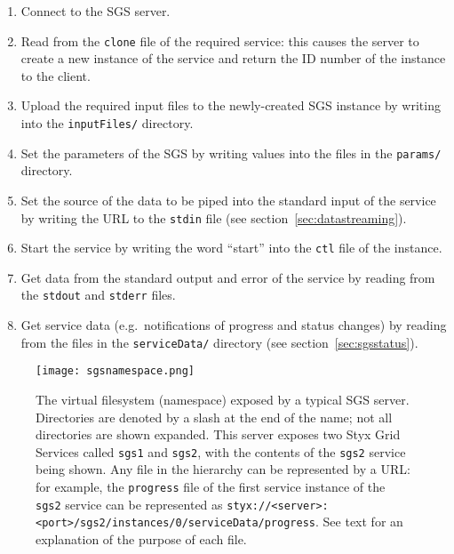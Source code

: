\documentclass[a4paper]{article}
\begin{document}
\begin{multicols}{2}
\begin{enumerate}
\item Connect to the SGS server.
\item Read from the \texttt{clone} file of the required service: this causes the server to create a new instance of the service and return the ID number of the instance to the client.
\item Upload the required input files to the newly-created SGS instance by writing into the \texttt{inputFiles/} directory.
\item Set the parameters of the SGS by writing values into the files in the \texttt{params/} directory.
\item Set the source of the data to be piped into the standard input of the service by writing the URL to the \texttt{stdin} file (see section~\ref{sec:datastreaming}).\label{item:inputstream}
\item Start the service by writing the word ``start'' into the \texttt{ctl} file of the instance.
\item Get data from the standard output and error of the service by reading from the \texttt{stdout} and \texttt{stderr} files.
\item Get service data (e.g.\ notifications of progress and status changes) by reading from the files in the \texttt{serviceData/} directory (see section~\ref{sec:sgsstatus}).
\end{enumerate}

\begin{figure*}
\centering
\texttt{[image: sgsnamespace.png]}
\caption{The virtual filesystem (namespace) exposed by a typical SGS server.  Directories are denoted by a slash at the end of the name; not all directories are shown expanded.  This server exposes two Styx Grid Services called {\tt sgs1} and {\tt sgs2}, with the contents of the {\tt sgs2} service being shown.  Any file in the hierarchy can be represented by a URL: for example, the {\tt progress} file of the first service instance of the {\tt sgs2} service can be represented as {\tt styx://<server>:<port>/sgs2/instances/0/serviceData/progress}.  See text for an explanation of the purpose of each file.}
\label{fig:sgsfullnamespace}
\end{figure*}


\end{multicols}
\end{document}
